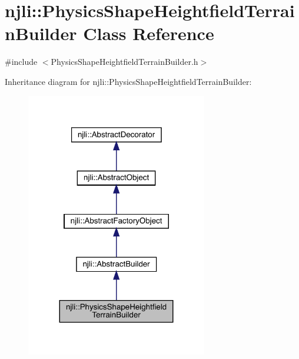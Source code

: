 \hypertarget{classnjli_1_1_physics_shape_heightfield_terrain_builder}{}\section{njli\+:\+:Physics\+Shape\+Heightfield\+Terrain\+Builder Class Reference}
\label{classnjli_1_1_physics_shape_heightfield_terrain_builder}


{\ttfamily \#include $<$Physics\+Shape\+Heightfield\+Terrain\+Builder.\+h$>$}



Inheritance diagram for njli\+:\+:Physics\+Shape\+Heightfield\+Terrain\+Builder\+:\nopagebreak
\begin{figure}[H]
\begin{center}
\leavevmode
\includegraphics[width=224pt]{classnjli_1_1_physics_shape_heightfield_terrain_builder__inherit__graph}
\end{center}
\end{figure}


